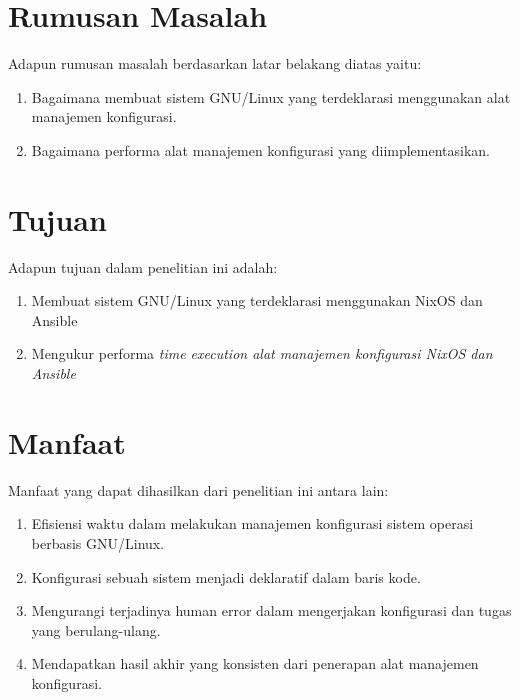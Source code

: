 \documentclass[10pt,]{report}
\begin{document}
\section{Rumusan Masalah}
\vspace{-3mm}
\begin{adjustwidth}{0.70cm}{}
	Adapun rumusan masalah berdasarkan latar belakang diatas yaitu:
	\begin{enumerate}[leftmargin=0.45cm]
		\item Bagaimana membuat sistem GNU/Linux yang terdeklarasi menggunakan alat
		      manajemen konfigurasi.
		\item Bagaimana performa alat manajemen konfigurasi yang diimplementasikan.
	\end{enumerate}
\end{adjustwidth}
\section{Tujuan}
\vspace{-3mm}
\begin{adjustwidth}{0.70cm}{}
	Adapun tujuan dalam penelitian ini adalah:
	\begin{enumerate}[leftmargin=0.45cm]
		\item Membuat sistem GNU/Linux yang terdeklarasi menggunakan NixOS dan
		      Ansible
		\item Mengukur performa \it{time execution} alat manajemen konfigurasi
		      NixOS dan Ansible
	\end{enumerate}
\end{adjustwidth}
\vspace{3mm}
\section{Manfaat}
\vspace{-3mm}
\begin{adjustwidth}{0.70cm}{}
	Manfaat yang dapat dihasilkan dari penelitian ini antara lain:
	\begin{enumerate}[leftmargin=0.45cm]
		\item Efisiensi waktu dalam melakukan manajemen konfigurasi sistem operasi berbasis GNU/Linux.
		\item Konfigurasi sebuah sistem menjadi deklaratif dalam baris kode.
		\item Mengurangi terjadinya human error dalam mengerjakan konfigurasi dan tugas yang berulang-ulang.
		\item Mendapatkan hasil akhir yang konsisten dari penerapan alat manajemen konfigurasi.
	\end{enumerate}
\end{adjustwidth}
\vspace{3mm}
\end{document}
